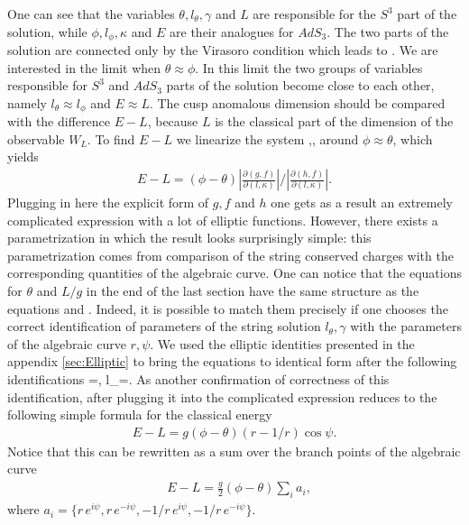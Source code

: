 One can see that the variables $\theta,l_{\theta},\gamma$ and $L$ are responsible for the $S^3$ part of the solution, while  $\phi,l_{\phi},\kappa$ and $E$ are their analogues for $AdS_3$. The two parts of the solution are connected only by the Virasoro condition which leads to .
We are interested in the limit when $\theta\approx\phi$. In this limit the two groups of variables responsible for $S^3$ and $AdS_3$ parts of the solution become close to each other, namely $l_{\theta}\approx l_{\phi}$ and $E\approx L$. The cusp anomalous dimension should be compared with the difference $E-L$, because $L$ is the classical part of the dimension of the observable $W_L$. To find $E-L$ we linearize the system ,, around $\phi\approx\theta$, which yields
\begin{align}
E-L=(\phi-\theta)\left|\frac{\partial{(g,f)}}{\partial{(l,\kappa)}}\right|/\left|\frac{\partial{(h,f)}}{\partial{(l,\kappa)}}\right|.
\label{eq:ELbig}
\end{align}
Plugging in here the explicit form of $g,f$ and $h$ one gets as a result an extremely complicated expression with a lot of elliptic functions. However, there exists a parametrization in which the result looks surprisingly simple: this parametrization comes from comparison of the string conserved charges with the corresponding quantities of the algebraic curve. One can notice that the equations for $\theta$ and $L/g$ in the end of the last section have the same structure as the equations  and . Indeed, it is possible to match them precisely if one chooses the correct identification of parameters of the string solution $l_\theta,\gamma$ with the parameters of the algebraic curve $r,\psi$. We used the elliptic identities presented in the appendix \ref{sec:Elliptic} to bring the equations to identical form after the following identifications
\beq
\gamma=,\; l_{\theta}=.
\label{eq:identification}
\eeq
As another confirmation of correctness of this identification, after plugging it into  the complicated expression reduces to the following simple formula for the classical energy
\begin{align}
E-L=g(\phi-\theta)(r-1/r)\cos\psi.
\label{eq:E1}
\end{align}
Notice that this can be rewritten as a sum over the branch points of the algebraic curve
\begin{align}
&E-L=\frac{g}{2}(\phi-\theta)\sum\limits_i a_i,
\end{align}
where $a_i=\{r \, e^{i\psi}, r \, e^{-i\psi},-1/r \, e^{i\psi},-1/r \, e^{-i\psi}\}$.


